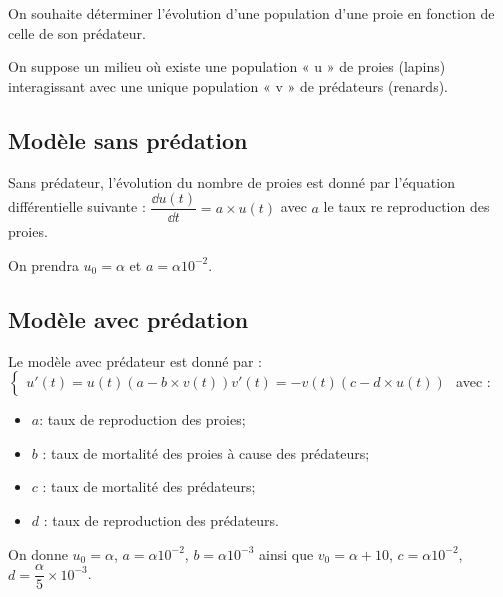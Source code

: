 \begin{obj}
On souhaite déterminer l’évolution d’une population d’une proie en fonction de celle de son prédateur.
\end{obj}

On suppose un milieu où existe une population « u » de proies (lapins) interagissant avec une unique population « v » de prédateurs (renards).

\subsection*{Modèle sans prédation}

Sans prédateur, l'évolution du nombre de proies est donné par l'équation différentielle suivante : $\dfrac{\dd u(t)}{\dd t} = a \times u(t)$ avec $a$ le taux re reproduction des proies. 

On prendra  $u_0 = \alpha$ et $a=\alpha 10^{-2}$. 



\subsection*{Modèle avec prédation}
Le modèle avec prédateur est donné par : 
$\left\{
\begin{array}{l}
u'(t)=u(t)\left(a - b\times v(t)\right)
v'(t)=-v(t)\left(c - d\times u(t)\right)
\end{array}
\right.
$
avec :
\begin{itemize}
\item $a $: taux de reproduction des proies;
\item $b$ : taux de mortalité des proies à cause des prédateurs;
\item $c$ : taux de mortalité des prédateurs;
\item $d$ : taux de reproduction des prédateurs.
\end{itemize}

On donne $u_0=\alpha$, $a=\alpha 10^{-2}$, $b=\alpha 10^{-3}$ ainsi que 
$v_0=\alpha+10$, $c=\alpha 10^{-2}$, $d=\dfrac{\alpha}{5} \times  10^{-3}$.




